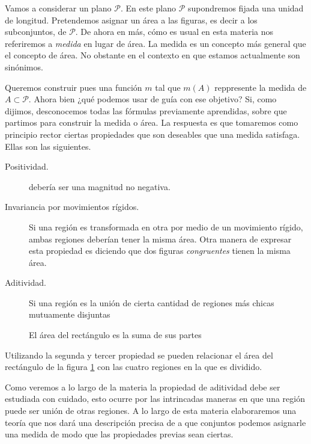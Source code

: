 Vamos a considerar un plano $\mathcal{P}$. En este plano $\mathcal{P}$ supondremos fijada una unidad de longitud.  Pretendemos asignar un área a las figuras, es decir a los subconjuntos, de $\mathcal{P}$. De ahora en más, cómo es usual en esta materia  nos referiremos a \emph{medida} en lugar de área. La medida es un concepto más general  que el concepto de área. No obstante en el contexto en que estamos actualmente son sinónimos.  

Queremos construir pues una función $m$ tal que $m(A)$ reppresente la medida  de  $A\subset\mathcal{P}$. Ahora bien ¿qué podemos usar de guía con ese objetivo? Si, como dijimos,  desconocemos todas las fórmulas previamente aprendidas, sobre que partimos para construir la medida o área. La respuesta es que tomaremos como principio rector  ciertas propiedades que son deseables  que una medida satisfaga. Ellas son las  siguientes. 




\begin{description}
 \item[Positividad.] debería ser una magnitud no negativa.  
 \item[Invariancia por movimientos rígidos.] Si una región es transformada en otra por medio de un movimiento rígido, ambas regiones deberían tener la misma área. Otra manera de expresar esta propiedad es diciendo que dos figuras \emph{congruentes} tienen la misma área. 
 \item[Aditividad.] Si una región es la unión de cierta cantidad de regiones más chicas mutuamente disjuntas  
\end{description}

\begin{figure}[h]
\begin{center}
 
 \caption{El área del rectángulo es la suma de sus partes}\label{fig:rect_descop} 
\end{center}
\end{figure}

Utilizando la segunda y tercer propiedad se pueden relacionar el área del rectángulo de la figura \ref{fig:rect_descop} con las cuatro regiones en la que es dividido.

Como veremos a lo largo de la materia la propiedad de aditividad debe ser estudiada con cuidado, esto ocurre por las intrincadas maneras en que una región puede ser unión de otras regiones. A lo largo de esta materia elaboraremos una  teoría que nos dará una descripción  precisa de a que conjuntos podemos asignarle una medida de modo que las propiedades previas sean ciertas. 

